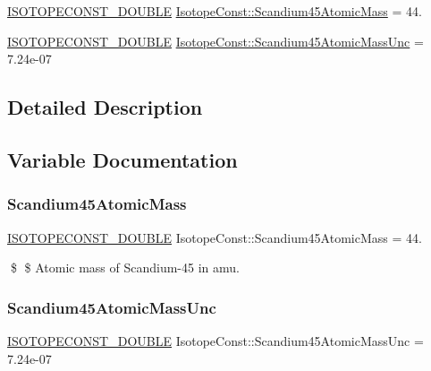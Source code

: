 \begin{DoxyCompactItemize}
\item 
\mbox{\hyperlink{group___isotope_const-_macros_ga8f45a7272ce02c0b4c65c44636ed719a}{I\+S\+O\+T\+O\+P\+E\+C\+O\+N\+S\+T\+\_\+\+D\+O\+U\+B\+LE}} \mbox{\hyperlink{group___isotope_const-_scandium-_sc45_gafd3abfb8dc7f418444d4af6f6e206dc9}{Isotope\+Const\+::\+Scandium45\+Atomic\+Mass}} = 44.
\item 
\mbox{\hyperlink{group___isotope_const-_macros_ga8f45a7272ce02c0b4c65c44636ed719a}{I\+S\+O\+T\+O\+P\+E\+C\+O\+N\+S\+T\+\_\+\+D\+O\+U\+B\+LE}} \mbox{\hyperlink{group___isotope_const-_scandium-_sc45_ga348c9cbf116ece4f80e9849f1a3bb503}{Isotope\+Const\+::\+Scandium45\+Atomic\+Mass\+Unc}} = 7.\+24e-\/07
\end{DoxyCompactItemize}


\subsection{Detailed Description}


\subsection{Variable Documentation}
\mbox{\label{group___isotope_const-_scandium-_sc45_gafd3abfb8dc7f418444d4af6f6e206dc9}} 
\subsubsection{\texorpdfstring{Scandium45\+Atomic\+Mass}{Scandium45AtomicMass}}
{\footnotesize\ttfamily \mbox{\hyperlink{group___isotope_const-_macros_ga8f45a7272ce02c0b4c65c44636ed719a}{I\+S\+O\+T\+O\+P\+E\+C\+O\+N\+S\+T\+\_\+\+D\+O\+U\+B\+LE}} Isotope\+Const\+::\+Scandium45\+Atomic\+Mass = 44.}

\$ \$ Atomic mass of Scandium-\/45 in amu. \mbox{\label{group___isotope_const-_scandium-_sc45_ga348c9cbf116ece4f80e9849f1a3bb503}} 
\subsubsection{\texorpdfstring{Scandium45\+Atomic\+Mass\+Unc}{Scandium45AtomicMassUnc}}
{\footnotesize\ttfamily \mbox{\hyperlink{group___isotope_const-_macros_ga8f45a7272ce02c0b4c65c44636ed719a}{I\+S\+O\+T\+O\+P\+E\+C\+O\+N\+S\+T\+\_\+\+D\+O\+U\+B\+LE}} Isotope\+Const\+::\+Scandium45\+Atomic\+Mass\+Unc = 7.\+24e-\/07}

